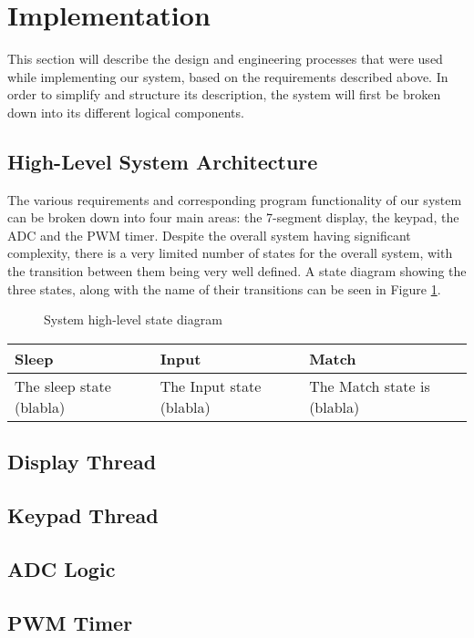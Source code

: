\section{Implementation}

This section will describe the design and engineering processes that were used while implementing our system, based on the requirements described above. In order to simplify and structure its description, the system will first be broken down into its different logical components.


\subsection{High-Level System Architecture}
The various requirements and corresponding program functionality of our system can be broken down into four main areas: the 7-segment display, the keypad, the ADC and the PWM timer. Despite the overall system having significant complexity, there is a very limited number of states for the overall system, with the transition between them being very well defined. A state diagram showing the three states, along with the name of their transitions can be seen in Figure \ref{high_level_state_diagram}.


\begin{figure}[h]
\label{high_level_state_diagram}
\centering
{}
\caption{System high-level state diagram}
\end{figure}




\begin{tabular}{ p{4cm} | p{4cm} | p{4cm}}
Sleep & Input & Match \\
\hline
The sleep state (blabla)
&
The Input state (blabla)

&
The Match state is (blabla)
\\
\end{tabular}


\subsection{Display Thread}

\subsection{Keypad Thread}

\subsection{ADC Logic}

\subsection{PWM Timer}
